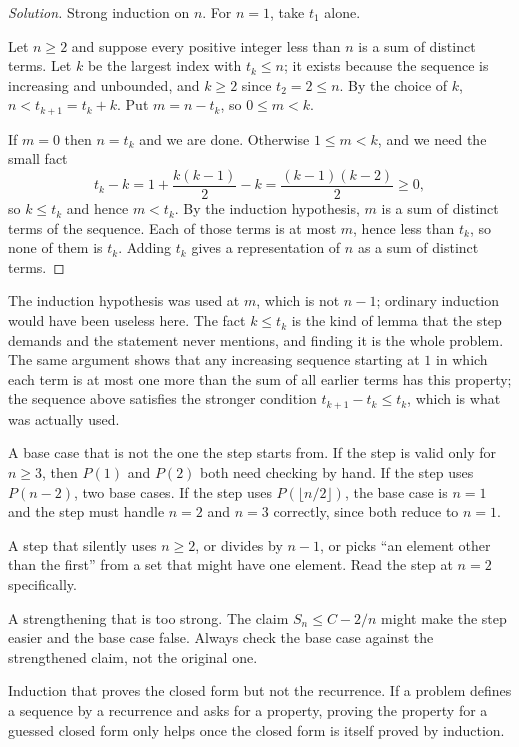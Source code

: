 \begin{proof}[Solution]
Strong induction on $n$. For $n = 1$, take $t_1$ alone.

Let $n \ge 2$ and suppose every positive integer less than $n$ is a sum of distinct terms. Let $k$ be the largest index with $t_k \le n$; it exists because the sequence is increasing and unbounded, and $k \ge 2$ since $t_2 = 2 \le n$. By the choice of $k$, $n < t_{k+1} = t_k + k$. Put $m = n - t_k$, so $0 \le m < k$.

If $m = 0$ then $n = t_k$ and we are done. Otherwise $1 \le m < k$, and we need the small fact
\[
t_k - k = 1 + \frac{k(k-1)}{2} - k = \frac{(k-1)(k-2)}{2} \ge 0 ,
\]
so $k \le t_k$ and hence $m < t_k$. By the induction hypothesis, $m$ is a sum of distinct terms of the sequence. Each of those terms is at most $m$, hence less than $t_k$, so none of them is $t_k$. Adding $t_k$ gives a representation of $n$ as a sum of distinct terms.
\end{proof}

The induction hypothesis was used at $m$, which is not $n - 1$; ordinary induction would have been useless here. The fact $k \le t_k$ is the kind of lemma that the step demands and the statement never mentions, and finding it is the whole problem. The same argument shows that any increasing sequence starting at $1$ in which each term is at most one more than the sum of all earlier terms has this property; the sequence above satisfies the stronger condition $t_{k+1} - t_k \le t_k$, which is what was actually used.

\begin{trap}
A base case that is not the one the step starts from. If the step is valid only for $n \ge 3$, then $P(1)$ and $P(2)$ both need checking by hand. If the step uses $P(n-2)$, two base cases. If the step uses $P(\lfloor n/2 \rfloor)$, the base case is $n = 1$ and the step must handle $n = 2$ and $n = 3$ correctly, since both reduce to $n = 1$.

A step that silently uses $n \ge 2$, or divides by $n - 1$, or picks ``an element other than the first'' from a set that might have one element. Read the step at $n = 2$ specifically.

A strengthening that is too strong. The claim $S_n \le C - 2/n$ might make the step easier and the base case false. Always check the base case against the strengthened claim, not the original one.

Induction that proves the closed form but not the recurrence. If a problem defines a sequence by a recurrence and asks for a property, proving the property for a guessed closed form only helps once the closed form is itself proved by induction.
\end{trap}

